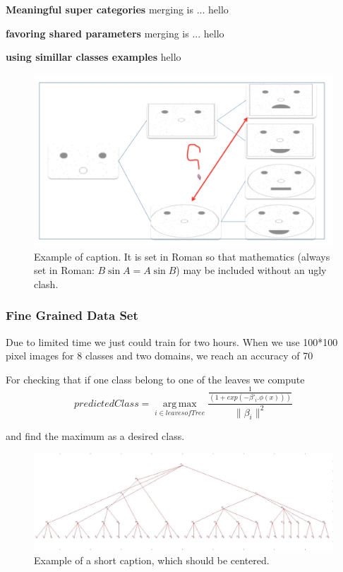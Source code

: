 \documentclass[10pt,twocolumn,letterpaper]{article}
\begin{document}
 
\textbf{Meaningful super categories} merging is ...
  hello
  
  
\textbf{favoring shared parameters} merging is ...
hello


\textbf{using simillar classes examples}
hello

   
   
 \begin{figure}[t]
 	\begin{center}
 		\includegraphics[width=0.8\linewidth]{merge}
 	\end{center}
 	\caption{Example of caption.  It is set in Roman so that mathematics
 		(always set in Roman: $B \sin A = A \sin B$) may be included without an
 		ugly clash.}
 	\label{fig:long}
 	\label{fig:onecol}
 \end{figure}
 
 


 \subsubsection{Fine Grained Data Set}
Due to limited time we just could train for two hours. When we use 100*100 pixel images for 8 classes and two domains, we reach an accuracy of 70%

For checking that if one class belong to one of the leaves we compute 
\begin{displaymath}
predictedClass = \operatorname*{arg\,max}_{i \in leaves of Tree} 
\frac{\frac{1}{(1+exp(-\beta'_i.\phi(x)))}}{\|\beta_i\|^2}
\end{displaymath}  

and find the maximum as a desired class.

\begin{figure}
	\begin{center}
	    \includegraphics[width=1\linewidth]{carsDogs.png}
	\end{center}
	\caption{Example of a short caption, which should be centered.}
	\label{fig:short}
\end{figure}
{\small
  
  
}
\end{document}
